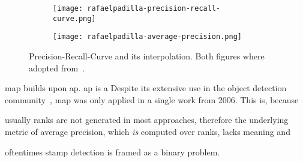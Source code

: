 \begin{figure}[htp!]
    \begin{subfigure}[t]{.49\linewidth}
        \centering
        \texttt{[image: rafaelpadilla-precision-recall-curve.png]}
    \end{subfigure}
    \hfill
    \begin{subfigure}[t]{.49\linewidth}
        \centering
        \texttt{[image: rafaelpadilla-average-precision.png]}
    \end{subfigure}
    \caption[Precision-Recall-Curve]{Precision-Recall-Curve and its
    interpolation. Both figures where adopted from~\cite{Padilla.2019}.}\label{fig:precision-recall-curve}
\end{figure}

\Gls{map} builds upon \gls{ap}. \Gls{ap} is a 
Despite its extensive use in the object detection community~\cite{Liu.2016,Ren.2015}, 
\Gls{map} was only applied in a single work \cite{Zhu.2006} from 2006. This is,
because 
\begin{enumerate*}[i.)]
    \item usually ranks are not generated in most approaches, therefore the 
    underlying metric of average precision, which \textit{is} computed over ranks, 
    lacks meaning and
    \item oftentimes stamp detection is framed as a binary problem.
\end{enumerate*} 

